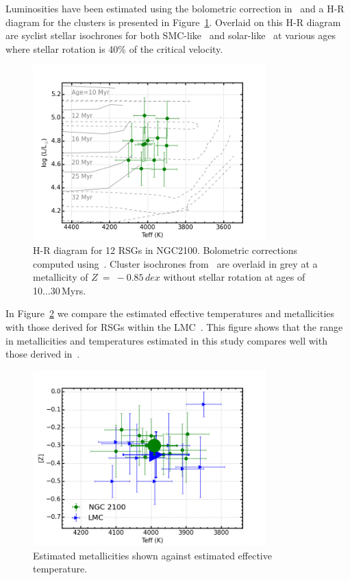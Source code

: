 \documentclass[useAMS,usenatbib]{mn2e}
\begin{document}
Luminosities have been estimated using the bolometric correction in~\cite{2013ApJ...767....3D} and a H-R diagram for the clusters is presented in Figure~\ref{fig:HRD}.
Overlaid on this H-R diagram are {\sc syclist} stellar isochrones for both SMC-like~\citep[solid lines][]{2013A&A...558A.103G} and solar-like~\citep[dashed lines][]{} at various ages where stellar rotation is 40\% of the critical velocity.



\begin{figure}
 \includegraphics[width=9.0cm]{NGC2100-HRD-iso}
 \caption{H-R diagram for 12 RSGs in NGC2100.
  Bolometric corrections computed using~\citet{2013ApJ...767....3D}.
  Cluster isochrones from~\citet{2013A&A...558A.103G} are overlaid in grey at a metallicity of $Z~=~-0.85\,dex$ without stellar rotation at ages of 10...30\,Myrs.
\label{fig:HRD}
          }
\end{figure}

In Figure~\ref{fig:TeffvsZ} we compare the estimated effective temperatures and metallicities with those derived for RSGs within the LMC~\citep{2015ApJ...806...21D}.
This figure shows that the range in metallicities and temperatures estimated in this study compares well with those derived in~\cite{2015ApJ...806...21D}.

\begin{figure}
 \includegraphics[width=9.0cm]{NGC2100-TeffvsZ-2100-LMC}
 \caption{Estimated metallicities shown against estimated effective temperature.
\label{fig:TeffvsZ}
          }
\end{figure}
\end{document}
